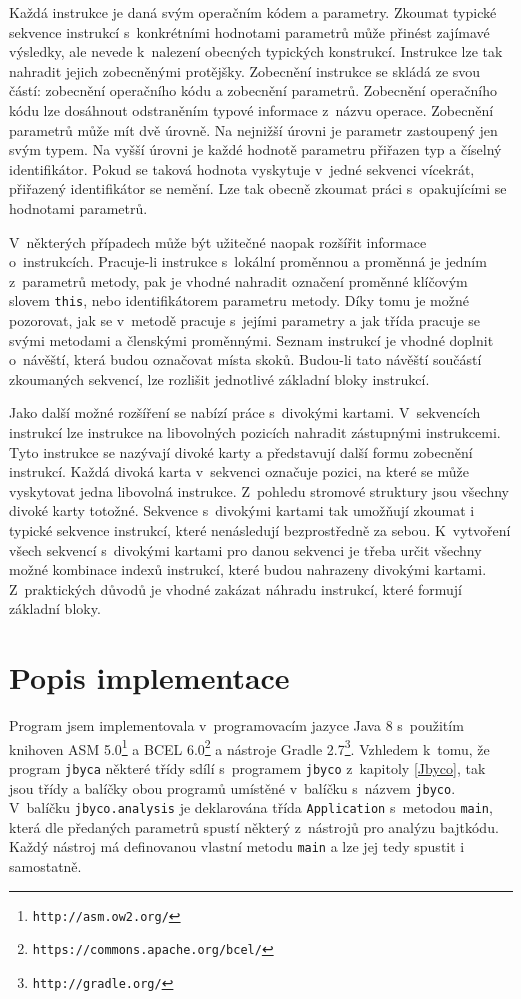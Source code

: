 Každá instrukce je daná svým operačním kódem a parametry. Zkoumat typické sekvence instrukcí s~konkrétními hodnotami parametrů může přinést zajímavé výsledky, ale nevede k~nalezení obecných typických konstrukcí. Instrukce lze tak nahradit jejich zobecněnými protějšky. Zobecnění instrukce se skládá ze svou částí: zobecnění operačního kódu a zobecnění parametrů. Zobecnění operačního kódu lze dosáhnout odstraněním typové informace z~názvu operace. Zobecnění parametrů může mít dvě úrovně. Na nejnižší úrovni je parametr zastoupený jen svým typem. Na vyšší úrovni je každé hodnotě parametru přiřazen typ a číselný identifikátor. Pokud se taková hodnota vyskytuje v~jedné sekvenci vícekrát, přiřazený identifikátor se nemění. Lze tak obecně zkoumat práci s~opakujícími se hodnotami parametrů.

V~některých případech může být užitečné naopak rozšířit informace o~instrukcích. Pracuje-li instrukce s~lokální proměnnou a proměnná je jedním z~parametrů metody, pak je vhodné nahradit označení proměnné klíčovým slovem \texttt{this}, nebo identifikátorem parametru metody. Díky tomu je možné pozorovat, jak se v~metodě pracuje s~jejími parametry a jak třída pracuje se svými metodami a členskými proměnnými.
Seznam instrukcí je vhodné doplnit o~návěští, která budou označovat místa skoků. Budou-li tato návěští součástí zkoumaných sekvencí, lze rozlišit jednotlivé základní bloky instrukcí.

Jako další možné rozšíření se nabízí práce s~divokými kartami.
V~sekvencích instrukcí lze instrukce na libovolných pozicích nahradit zástupnými instrukcemi.
Tyto instrukce se nazývají divoké karty a představují další formu zobecnění instrukcí. Každá divoká karta v~sekvenci označuje pozici, na které se může vyskytovat jedna libovolná instrukce. Z~pohledu stromové struktury jsou všechny divoké karty totožné.
 Sekvence s~divokými kartami tak umožňují zkoumat i typické sekvence instrukcí, které nenásledují bezprostředně za sebou. K~vytvoření všech sekvencí s~divokými kartami pro danou sekvenci je třeba určit všechny možné kombinace indexů instrukcí, které budou nahrazeny divokými kartami. Z~praktických důvodů je vhodné zakázat náhradu instrukcí, které formují základní bloky.

\section{Popis implementace}\label{Jbyca:Implementation}

Program jsem implementovala v~programovacím jazyce Java 8 s~použitím knihoven ASM 5.0\footnote{\texttt{http://asm.ow2.org/}} a BCEL 6.0\footnote{\texttt{https://commons.apache.org/bcel/}} a nástroje Gradle 2.7\footnote{\texttt{http://gradle.org/}}. 
Vzhledem k~tomu, že program \texttt{jbyca} některé třídy sdílí s~programem \texttt{jbyco} z~kapitoly \ref{Jbyco}, tak jsou třídy a balíčky obou programů umístěné v~balíčku s~názvem \texttt{jbyco}.
 V~balíčku \texttt{jbyco.analysis} je deklarována třída \texttt{Application} s~metodou \texttt{main}, která dle předaných parametrů spustí některý z~nástrojů pro analýzu bajtkódu. Každý nástroj má definovanou vlastní metodu \texttt{main} a lze jej tedy spustit i samostatně.

